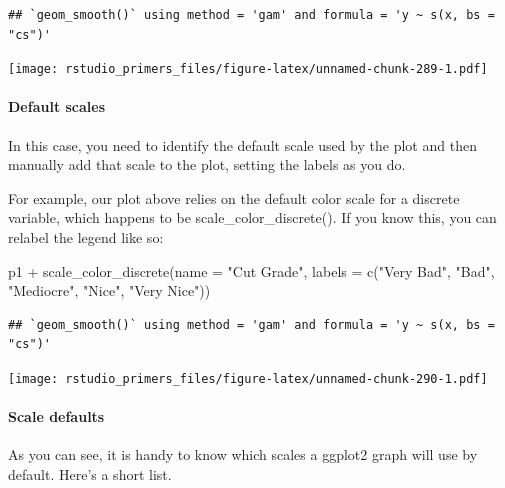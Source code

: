 \documentclass[
]{article}
\newenvironment{Shaded}{\begin{snugshade}}{\end{snugshade}}
\newcommand{\AttributeTok}[1]{\textcolor[rgb]{0.77,0.63,0.00}{#1}}
\newcommand{\FunctionTok}[1]{\textcolor[rgb]{0.00,0.00,0.00}{#1}}
\newcommand{\NormalTok}[1]{#1}
\newcommand{\SpecialCharTok}[1]{\textcolor[rgb]{0.00,0.00,0.00}{#1}}
\newcommand{\StringTok}[1]{\textcolor[rgb]{0.31,0.60,0.02}{#1}}
\begin{document}
\begin{verbatim}
## `geom_smooth()` using method = 'gam' and formula = 'y ~ s(x, bs = "cs")'
\end{verbatim}

\texttt{[image: rstudio\_primers\_files/figure-latex/unnamed-chunk-289-1.pdf]}

\hypertarget{default-scales}{%
\paragraph{Default scales}\label{default-scales}}

In this case, you need to identify the default scale used by the plot
and then manually add that scale to the plot, setting the labels as you
do.

For example, our plot above relies on the default color scale for a
discrete variable, which happens to be scale\_color\_discrete(). If you
know this, you can relabel the legend like so:

\begin{Shaded}
\begin{Highlighting}[]
\NormalTok{p1 }\SpecialCharTok{+} \FunctionTok{scale\_color\_discrete}\NormalTok{(}\AttributeTok{name =} \StringTok{"Cut Grade"}\NormalTok{, }\AttributeTok{labels =} \FunctionTok{c}\NormalTok{(}\StringTok{"Very Bad"}\NormalTok{, }\StringTok{"Bad"}\NormalTok{, }\StringTok{"Mediocre"}\NormalTok{, }\StringTok{"Nice"}\NormalTok{, }\StringTok{"Very Nice"}\NormalTok{))}
\end{Highlighting}
\end{Shaded}

\begin{verbatim}
## `geom_smooth()` using method = 'gam' and formula = 'y ~ s(x, bs = "cs")'
\end{verbatim}

\texttt{[image: rstudio\_primers\_files/figure-latex/unnamed-chunk-290-1.pdf]}

\hypertarget{scale-defaults}{%
\paragraph{Scale defaults}\label{scale-defaults}}

As you can see, it is handy to know which scales a ggplot2 graph will
use by default. Here's a short list.
\end{document}
